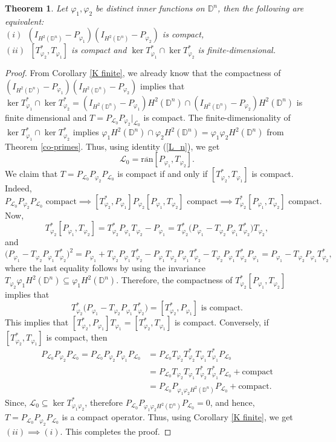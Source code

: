 \documentclass[12pt, a4 paper]{amsart}
\newcommand{\cll}{\mathcal{L}}
\newcommand{\D}{\mathbb{D}}
\theoremstyle{definition}
\theoremstyle{plain}
\newtheorem{thm}{Theorem}[section]
\theoremstyle{definition}
\numberwithin{equation}{section}
\let\phi=\varphi
\begin{document}
\begin{thm}\label{prod_comp}
Let $\phi_1, \phi_2$ be distinct inner functions on $\D^n$, then the following are equivalent:\\ \vspace{1mm}
$(i)$~$(I_{H^2(\D^n)} - P_{\phi_1})(I_{H^2(\D^n)}  - P_{\phi_2})$ is compact,\\ \vspace{1mm}
$(ii)$~$[T_{\phi_2}^*, T_{\phi_1}]$ is compact and $\ker T_{\phi_1}^* \cap \ker T_{\phi_2}^*$ is finite-dimensional.
\end{thm}
\begin{proof}
From Corollary \ref{K finite}, we already know that the compactness of $(I_{H^2(\D^n)}  - P_{\phi_1})(I _{H^2(\D^n)} - P_{\phi_2})$ implies that $\ker T_{\phi_1}^* \cap \ker T_{\phi_2}^* = (I_{H^2(\D^n)}  - P_{\phi_1})H^2(\D^n) \cap (I_{H^2(\D^n)}  - P_{\phi_2})H^2(\D^n)$ is finite dimensional and $T = P_{\cll_0} P_{\phi_2}|_{\cll_0}$ is compact. The finite-dimensionality of $\ker T_{\phi_1}^* \cap \ker T_{\phi_2}^*$ implies $\phi_1 H^2(\D^n) \cap \phi_2 H^2(\D^n)  = \phi_1 \phi_2H^2(\D^n)$ from Theorem \ref{co-primes}. Thus, using identity (\ref{L_n}), we get
\[
\cll_0 = \overline{\mbox{ran}}[P_{\phi_1}, T_{\phi_2}].
\]
We claim that $T=  P_{\cll_0} P_{\phi_2}P_{\cll_0}$ is compact if and only if $[T_{\phi_2}^*, T_{\phi_1} ] $ is compact. Indeed,
\[
P_{\cll_0} P_{\phi_2}P_{\cll_0} \text{ compact} \implies [T_{\phi_2}^*, P_{\phi_1}]P_{\phi_2}[P_{\phi_1}, T_{\phi_2}] \text{ compact} \implies T_{\phi_2}^*[P_{\phi_1}, T_{\phi_2}] \text{ compact}.
\]
Now,
\[
T_{\phi_2}^*[P_{\phi_1}, T_{\phi_2}] = T_{\phi_2}^*P_{\phi_1}T_{\phi_2} - P_{\phi_1} = T_{\phi_2}^* \big(P_{\phi_1} - T_{\phi_2} P_{\phi_1}T_{\phi_2} ^* \big) T_{\phi_2},
\]
and
\[
\big(P_{\phi_1} - T_{\phi_2} P_{\phi_1}T_{\phi_2} ^* \big)^2 = P_{\phi_1} + T_{\phi_2} P_{\phi_1}T_{\phi_2} ^*   - P_{\phi_1}T_{\phi_2} P_{\phi_1}T_{\phi_2}^* - T_{\phi_2} P_{\phi_1}T_{\phi_2}^*P_{\phi_1} = P_{\phi_1} - T_{\phi_2} P_{\phi_1}T_{\phi_2}^*,
\]
where the last equality follows by using the invariance $ T_{\phi_2} \phi_1 H^2(\D^n) \subseteq \phi_1 H^2(\D^n)$. Therefore, the compactness of $T_{\phi_2}^*[P_{\phi_1}, T_{\phi_2}]$ implies that 
\[
 T_{\phi_2}^* \big(P_{\phi_1} - T_{\phi_2} P_{\phi_1}T_{\phi_2} ^* \big)  = [T_{\phi_2}^*, P_{\phi_1}]\text{ is compact}.
\]
This implies that $[T_{\phi_2}^*, P_{\phi_1}]T_{\phi_1} = [T_{\phi_2}^*, T_{\phi_1}]$ is compact. 
Conversely, if $[T_{\phi_2}^*, T_{\phi_1}]$ is compact, then
\begin{align*}
P_{\cll_0} P_{\phi_2}P_{\cll_0} = P_{\cll_0} P_{\phi_2}P_{\phi_1}P_{\cll_0} &= P_{\cll_0} T_{\phi_2} T_{\phi_2}^*T_{\phi_1}T_{\phi_1}^*P_{\cll_0} \\
&= P_{\cll_0} T_{\phi_2} T_{\phi_1}T_{\phi_2}^*T_{\phi_1}^*P_{\cll_0} + \text{compact}\\
&= P_{\cll_0} P_{\phi_1 \phi_2 H^2(\D^n)}P_{\cll_0} +  \text{compact}.
\end{align*}
Since, $\cll_0 \subseteq \ker T_{\phi_1 \phi_2}^*$, therefore $P_{\cll_0} P_{\phi_1 \phi_2 H^2(\D^n)}P_{\cll_0} =0$, and hence, $T = P_{\cll_0} P_{\phi_2}P_{\cll_0}$ is a compact operator. Thus, using Corollary \ref{K finite}, we get $(ii) \implies (i)$. This completes the proof.
\end{proof}
\end{document}
